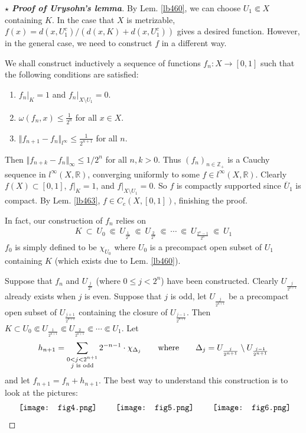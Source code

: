 \documentclass[12pt,b5paper,notitlepage]{article}
\theoremstyle{definition}
\theoremstyle{plain}
\newcommand{\ovl}{\overline}
\newcommand{\Zbb}{\mathbb Z}
\newcommand{\Rbb}{\mathbb R}
\numberwithin{equation}{section}
\begin{document}
\begin{proof}[$\star$ \textbf{Proof of Urysohn's lemma}]
By Lem. \ref{lb460}, we can choose $U_1\Subset X$ containing $K$. In the case that $X$ is metrizable, $f(x)=d(x,U_1^c)/(d(x,K)+d(x,U_1^c))$ gives a desired function. However, in the general case, we need to construct $f$ in a different way. 

We shall construct inductively a sequence of functions $f_n:X\rightarrow[0,1]$ such that the following conditions are satisfied:
\begin{enumerate}[label=(\alph*)]
\item $f_n|_K=1$ and $f_n|_{X\setminus U_1}=0$.
\item $\omega(f_n,x)\leq \frac 1{2^n}$ for all $x\in X$.
\item $\Vert f_{n+1}-f_n\Vert_{l^\infty}\leq \frac 1{2^{n+1}}$ for all $n$.
\end{enumerate}
Then $\Vert f_{n+k}-f_n\Vert_\infty\leq 1/2^n$ for all $n,k>0$. Thus $(f_n)_{n\in\Zbb_+}$ is a Cauchy sequence in $l^\infty(X,\Rbb)$, converging uniformly to some $f\in l^\infty(X,\Rbb)$. Clearly $f(X)\subset[0,1]$, $f|_K=1$, and $f|_{X\setminus U_1}=0$. So $f$ is compactly supported since $\ovl U_1$ is compact. By Lem. \ref{lb463}, $f\in C_c(X,[0,1])$, finishing the proof.

In fact, our construction of $f_n$ relies on
\begin{align*}
K~\subset~ U_0~\Subset~ U_{\frac 1{2^n}}~\Subset~ U_{\frac 2{2^n}}~\Subset~\cdots~\Subset ~U_{\frac{2^{n}-1}{2^n}}~\Subset ~U_1
\end{align*}
$f_0$ is simply defined to be $\chi_{U_0}$ where $U_0$ is a precompact open subset of $U_1$ containing $K$ (which exists due to Lem. \ref{lb460}). 

Suppose that $f_n$ and $U_{\frac j{2^n}}$ (where $0\leq j<2^n$) have been constructed. Clearly $U_{\frac j{2^{n+1}}}$ already exists when $j$ is even. Suppose that $j$ is odd, let $U_{\frac j{2^{n+1}}}$ be a precompact open subset of $U_{\frac {j+1}{2^{n+1}}}$ containing the closure of  $U_{\frac {j-1}{2^{n+1}}}$. Then $K\subset U_0\Subset U_{\frac 1{2^{n+1}}}\Subset U_{\frac 2{2^{n+1}}}\Subset\cdots\Subset U_1$. Let
\begin{align*}
h_{n+1}=\sum_{
\begin{subarray}{c}
0<j<2^{n+1}\\
j\text{ is odd}
\end{subarray}
}2^{-n-1}\cdot\chi_{\Delta_j}\qquad\text{where}\qquad \Delta_j=U_{\frac j{2^{n+1}}}\setminus U_{\frac{j-1}{2^{n+1}}}
\end{align*}
and let $f_{n+1}=f_n+h_{n+1}$. The best way to understand this construction is to look at the pictures:
\begin{gather*}
\vcenter{\hbox{{
			\texttt{[image: fig4.png]}}}}
\qquad
\vcenter{\hbox{{
			\texttt{[image: fig5.png]}}}}
\qquad
\vcenter{\hbox{{
			\texttt{[image: fig6.png]}}}}
\end{gather*}



\end{proof}
\end{document}
